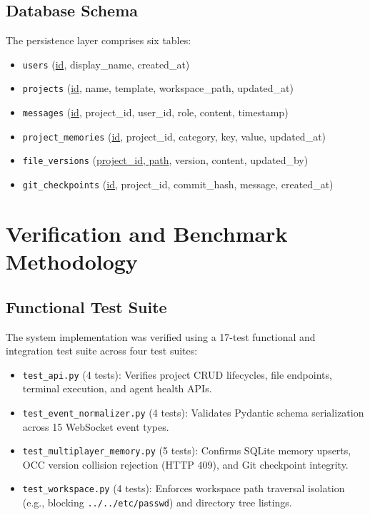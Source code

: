 \documentclass[conference]{IEEEtran}
\begin{document}
\subsection{Database Schema}
The persistence layer comprises six tables:
\begin{itemize}
    \item \texttt{users} (\underline{id}, display\_name, created\_at)
    \item \texttt{projects} (\underline{id}, name, template, workspace\_path, updated\_at)
    \item \texttt{messages} (\underline{id}, project\_id, user\_id, role, content, timestamp)
    \item \texttt{project\_memories} (\underline{id}, project\_id, category, key, value, updated\_at)
    \item \texttt{file\_versions} (\underline{project\_id, path}, version, content, updated\_by)
    \item \texttt{git\_checkpoints} (\underline{id}, project\_id, commit\_hash, message, created\_at)
\end{itemize}

\section{Verification and Benchmark Methodology}

\subsection{Functional Test Suite}
The system implementation was verified using a 17-test functional and integration test suite across four test suites:
\begin{itemize}
    \item \texttt{test\_api.py} (4 tests): Verifies project CRUD lifecycles, file endpoints, terminal execution, and agent health APIs.
    \item \texttt{test\_event\_normalizer.py} (4 tests): Validates Pydantic schema serialization across 15 WebSocket event types.
    \item \texttt{test\_multiplayer\_memory.py} (5 tests): Confirms SQLite memory upserts, OCC version collision rejection (HTTP 409), and Git checkpoint integrity.
    \item \texttt{test\_workspace.py} (4 tests): Enforces workspace path traversal isolation (e.g., blocking \texttt{../../etc/passwd}) and directory tree listings.
\end{itemize}
\end{document}
